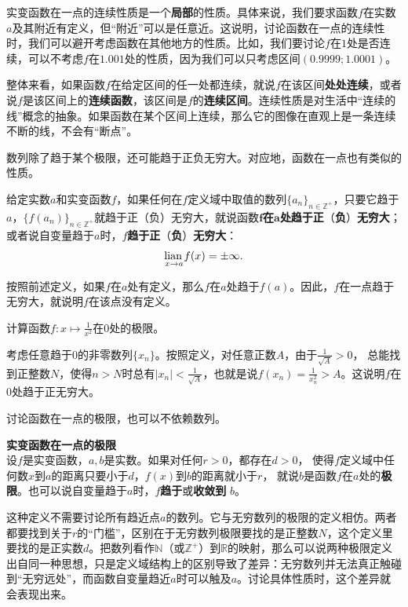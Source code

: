 \documentclass[12pt,UTF8]{ctexbook}
\begin{document}
实变函数在一点的连续性质是一个\textbf{局部}的性质。具体来说，我们要求函数$f$在实数$a$及其附近有定义，但“附近”可以是任意近。这说明，讨论函数在一点的连续性时，我们可以避开考虑函数在其他地方的性质。比如，我们要讨论$f$在$1$处是否连续，可以不考虑$f$在$1.001$处的性质，因为我们可以只考虑区间$(0.9999;1.0001)$。

整体来看，如果函数$f$在给定区间的任一处都连续，就说$f$在该区间\textbf{处处连续}，或者说$f$是该区间上的\textbf{连续函数}，该区间是$f$的\textbf{连续区间}。连续性质是对生活中“连续的线”概念的抽象。如果函数在某个区间上连续，那么它的图像在直观上是一条连续不断的线，不会有“断点”。

数列除了趋于某个极限，还可能趋于正负无穷大。对应地，函数在一点也有类似的性质。
\begin{df}
    给定实数$a$和实变函数$f$，如果任何在$f$定义域中取值的数列$\{a_n\}_{n\in\mathbb{Z}^+}$，只要它趋于$a$，$\{f(a_n)\}_{n\in\mathbb{Z}^+}$就趋于正（负）无穷大，就说函数$\boldsymbol{f}$\textbf{在}$\boldsymbol{a}$\textbf{处趋于正}（\textbf{负}）\textbf{无穷大}；或者说自变量趋于$a$时，$f$\textbf{趋于正}（\textbf{负}）\textbf{无穷大}：
    $$  \underset{x \to a}{\operatorname{lian}\,} f(x) = \pm\infty. $$
\end{df}
按照前述定义，如果$f$在$a$处有定义，那么$f$在$a$处趋于$f(a)$。因此，$f$在一点趋于无穷大，就说明$f$在该点没有定义。

\begin{et}
    计算函数$f: x\mapsto \displaystyle\frac{1}{x^2}$在$0$处的极限。
\end{et}
\begin{so}
    考虑任意趋于$0$的非零数列$\{x_n\}$。按照定义，对任意正数$A$，由于$\frac{1}{\sqrt{A}} > 0$，
    总能找到正整数$N$，使得$n>N$时总有$|x_n| < \frac{1}{\sqrt{A}}$，也就是说$f(x_n) = \displaystyle\frac{1}{x_n^2} > A$。这说明$f$在$0$处趋于正无穷大。
\end{so}

讨论函数在一点的极限，也可以不依赖数列。
\begin{df}\textbf{实变函数在一点的极限}\\
    设$f$是实变函数，$a, b$是实数。如果对任何$r>0$，都存在$d>0$，
    使得$f$定义域中任何数$x$到$a$的距离只要小于$d$，$f(x)$到$b$的距离就小于$r$，
    就说$b$是函数$f$在$a$处的\textbf{极限}。也可以说自变量趋于$a$时，$f$\textbf{趋于}或\textbf{收敛到} $b$。
\end{df}
这种定义不需要讨论所有趋近点$a$的数列。它与无穷数列的极限的定义相仿。两者都要找到关于$r$的“门槛”，区别在于无穷数列极限要找的是正整数$N$，这个定义里要找的是正实数$d$。把数列看作$\mathbb{N}$（或$\mathbb{Z}^+$）到$\mathbb{R}$的映射，那么可以说两种极限定义出自同一种思想，只是定义域结构上的区别导致了差异：无穷数列并无法真正触碰到“无穷远处”，而函数自变量趋近$a$时可以触及$a$。讨论具体性质时，这个差异就会表现出来。
\end{document}
